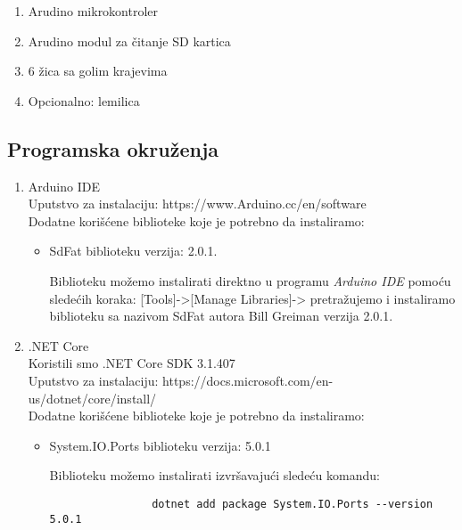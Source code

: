 \documentclass[a4paper]{extarticle}
\begin{document}
	\begin{enumerate}
		\item Arudino mikrokontroler
		\item Arudino modul za čitanje SD kartica
		\item 6 žica sa golim krajevima
		\item Opcionalno: lemilica
	\end{enumerate}

	\subsection{Programska okruženja}
	\label{l1}
	\begin{enumerate}
		\item Arduino IDE\\
			Uputstvo za instalaciju:  https://www.Arduino.cc/en/software\\
			Dodatne korišćene biblioteke koje je potrebno da instaliramo:
			\begin{itemize}
				\item SdFat biblioteku verzija: 2.0.1.
				
				Biblioteku možemo instalirati direktno u programu \textit{Arduino IDE} pomoću sledećih koraka:  [Tools]->[Manage Libraries]-> pretražujemo i instaliramo biblioteku sa nazivom SdFat autora Bill Greiman verzija 2.0.1.
			\end{itemize}
		
		
		\item .NET Core\\
		 Koristili smo .NET Core SDK 3.1.407\\
		Uputstvo za instalaciju: https://docs.microsoft.com/en-us/dotnet/core/install/\\
		Dodatne korišćene biblioteke koje je potrebno da instaliramo:
		\begin{itemize}
			\item System.IO.Ports biblioteku verzija: 5.0.1
			
			Biblioteku možemo instalirati izvršavajući sledeću komandu:
			\begin{small}
				\begin{verbatim}
				dotnet add package System.IO.Ports --version 5.0.1
				\end{verbatim}
			\end{small}
		\end{itemize}
		
		
	\end{enumerate}
	
\end{document}
